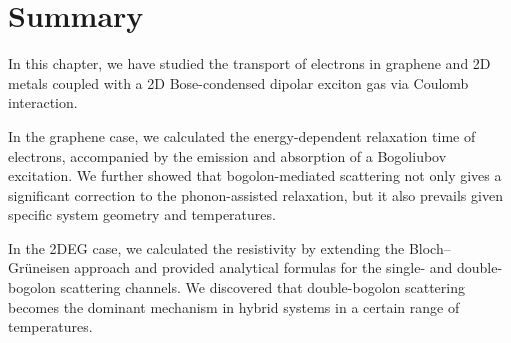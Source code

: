 
\section{Summary}
In this chapter, we have studied the transport of electrons in graphene and 2D metals coupled with a 2D Bose-condensed dipolar exciton gas via Coulomb interaction.

In the graphene case, we calculated the energy-dependent relaxation time of electrons, accompanied by the emission and absorption of a Bogoliubov excitation.
We further showed that bogolon-mediated scattering not only gives a significant correction to the phonon-assisted relaxation, but it also prevails given specific system geometry and temperatures.

In the 2DEG case, we calculated the resistivity by extending the Bloch--Gr\"{u}neisen approach and provided analytical formulas for the single- and double-bogolon scattering channels. We discovered that double-bogolon scattering becomes the dominant mechanism in hybrid systems in a certain range of temperatures.
%
